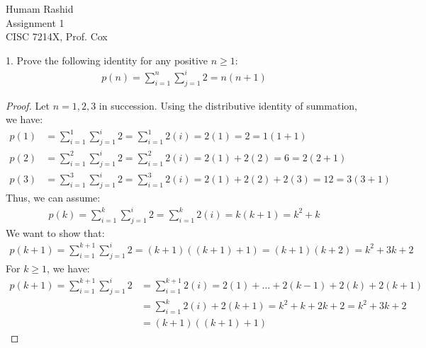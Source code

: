 \documentclass{scrartcl}
\begin{document}
\begin{flushleft}

    Humam Rashid\\
    Assignment 1\\
    CISC 7214X, Prof. Cox\\
    \bigskip
    
    1. Prove the following identity for any positive $n \geq 1$:
    \begin{align*}
        p(n) = \sum_{i=1}^{n}\sum_{j=1}^{i} 2 = n (n + 1)
    \end{align*}
    \begin{proof}
        Let $n = 1,2,3$ in succession. Using the distributive identity of summation, we have:
        \begin{align*}
            p(1) &= \sum_{i=1}^{1}\sum_{j=1}^{i} 2 = \sum_{i=1}^{1} 2(i) = 2(1) = 2 = 1(1 + 1)\\
            p(2) &= \sum_{i=1}^{2}\sum_{j=1}^{i} 2 = \sum_{i=1}^{2} 2(i) = 2(1) + 2(2) = 6
            = 2(2 + 1)\\
            p(3) &= \sum_{i=1}^{3}\sum_{j=1}^{i} 2 = \sum_{i=1}^{3} 2(i) = 2(1) + 2(2) + 2(3) = 12
            = 3(3 + 1)
        \end{align*}
        Thus, we can assume:
        \begin{align*}
            p(k) = \sum_{i=1}^{k}\sum_{j=1}^{i} 2 = \sum_{i=1}^{k} 2(i) = k(k + 1) = k^2 + k
        \end{align*}
        We want to show that:
        \begin{align*}
            p(k + 1) = \sum_{i=1}^{k + 1}\sum_{j=1}^{i} 2 = (k + 1) ((k + 1) + 1) = (k + 1) (k + 2)
            = k^2 + 3k + 2
        \end{align*}
        For $k \geq 1$, we have:
        \begin{align*}
            p(k + 1) = \sum_{i=1}^{k + 1}\sum_{j=1}^{i} 2 &= \sum_{i=1}^{k+1} 2(i) = 2(1) + \ldots
            + 2(k - 1) + 2(k) + 2(k + 1) \\
            &= \sum_{i=1}^{k} 2(i) + 2(k + 1) = k^2 + k + 2k + 2 = k^2 + 3k + 2 \\
            &= (k + 1) ((k + 1) + 1)
        \end{align*}
    \end{proof}
    \newpage

\end{flushleft}
\end{document}
